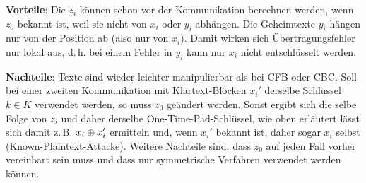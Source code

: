 \linie

\textbf{Vorteile}:
Die $z_i$ können schon vor der Kommunikation berechnen werden, wenn $z_0$ bekannt ist,
weil sie nicht von $x_i$ oder $y_i$ abhängen.
Die Geheimtexte $y_i$ hängen nur von der Position ab (also nur von $x_i$).
Damit wirken sich Übertragungsfehler nur lokal aus, d.\,h. bei einem Fehler in $y_i$ kann nur
$x_i$ nicht entschlüsselt werden.

\textbf{Nachteile}:
Texte sind wieder leichter manipulierbar als bei CFB oder CBC.
Soll bei einer zweiten Kommunikation mit Klartext-Blöcken $x_i'$
derselbe Schlüssel $k \in K$ verwendet werden,
so muss $z_0$ geändert werden.
Sonst ergibt sich die selbe Folge von $z_i$ und daher derselbe One-Time-Pad-Schlüssel,
wie oben erläutert lässt sich damit z.\,B. $x_i \oplus x_i'$ ermitteln und,
wenn $x_i'$ bekannt ist, daher sogar $x_i$ selbst (Known-Plaintext-Attacke).
Weitere Nachteile sind, dass $z_0$ auf jeden Fall vorher vereinbart sein muss und
dass nur symmetrische Verfahren verwendet werden können.

\pagebreak
